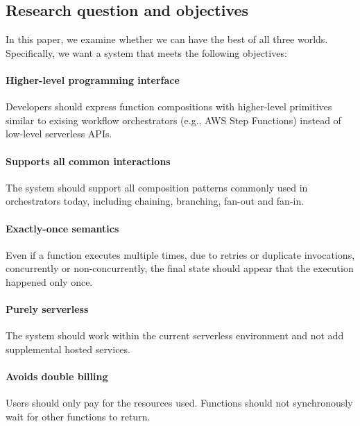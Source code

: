 \subsection{Research question and objectives}

In this paper, we examine whether we can have the best of all three worlds. Specifically, we want a system that meets the following objectives:

\paragraph{Higher-level programming interface} Developers should express
function compositions with higher-level primitives similar to exising workflow
orchestrators (e.g., AWS Step Functions) instead of low-level serverless APIs.

\paragraph{Supports all common interactions} The system should support all
composition patterns commonly used in orchestrators today, including chaining,
branching, fan-out and fan-in.

\paragraph{Exactly-once semantics} Even if a function executes multiple times,
due to retries or duplicate invocations, concurrently or non-concurrently, the
final state should appear that the execution happened only once.

\paragraph{Purely serverless} The system should work within the current
serverless environment and not add supplemental hosted services.

\paragraph{Avoids double billing} Users should only pay for the resources
used. Functions should not synchronously wait for other functions to return.





